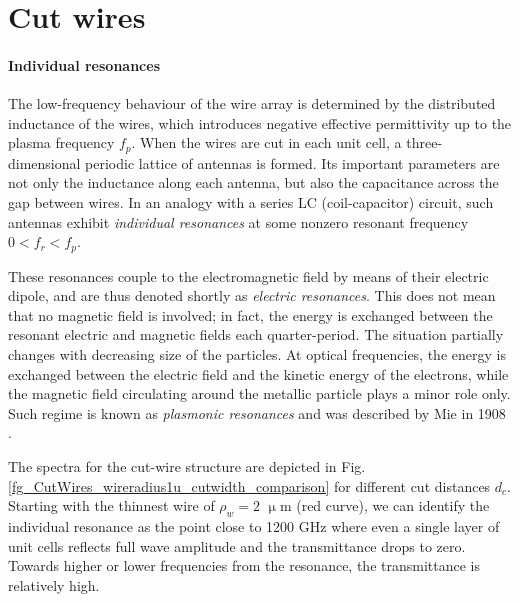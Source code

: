 

\FloatBarrier %
\section{Cut wires} \label{section_cutwires}
\paragraph{Individual resonances}%
The low-frequency behaviour of the wire array is determined by the distributed inductance of the wires, which introduces negative effective permittivity up to the plasma frequency $f_p$. When the wires are cut in each unit cell, a three-dimensional periodic lattice of antennas is formed. Its important parameters are not only the inductance along each antenna, but also the capacitance across the gap between wires. In an analogy with a series LC (coil-capacitor) circuit, such antennas exhibit \textit{individual resonances} at some nonzero resonant frequency $0<f_r<f_p$. 

These resonances couple to the electromagnetic field by means of their electric dipole, and are thus denoted shortly as \textit{electric resonances}. This does not mean that no magnetic field is involved; in fact, the energy is exchanged between the resonant electric and magnetic fields each quarter-period. The situation partially changes with decreasing size of the particles. At optical frequencies, the energy is exchanged between the electric field and the kinetic energy of the electrons, while the magnetic field circulating around the metallic particle plays a minor role only. Such regime is known as \textit{plasmonic resonances} and was described by Mie in 1908 \cite{mie1908beitrage}.

The spectra for the cut-wire structure are depicted in Fig. \ref{fg_CutWires_wireradius1u_cutwidth_comparison} for different cut distances $d_c$. Starting with the thinnest wire of $\rho_w = 2$ $\upmu$m (red curve), we can identify the individual resonance as the point close to  1200 GHz where even a single layer of unit cells reflects full wave amplitude and the transmittance drops to zero. Towards higher or lower frequencies from the resonance, the transmittance is relatively high.

